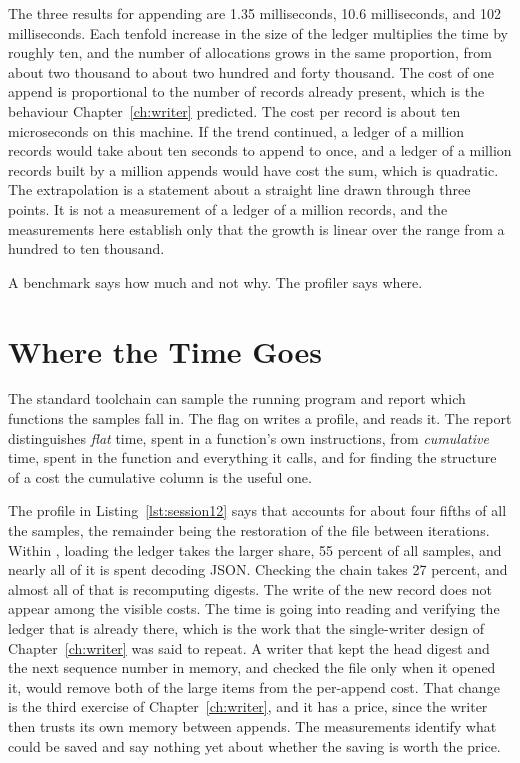 

The three results for appending are 1.35 milliseconds, 10.6 milliseconds, and 102 milliseconds. Each tenfold increase in the size of the ledger multiplies the time by roughly ten, and the number of allocations grows in the same proportion, from about two thousand to about two hundred and forty thousand. The cost of one append is proportional to the number of records already present, which is the behaviour Chapter~\ref{ch:writer} predicted. The cost per record is about ten microseconds on this machine. If the trend continued, a ledger of a million records would take about ten seconds to append to once, and a ledger of a million records built by a million appends would have cost the sum, which is quadratic. The extrapolation is a statement about a straight line drawn through three points. It is not a measurement of a ledger of a million records, and the measurements here establish only that the growth is linear over the range from a hundred to ten thousand.

A benchmark says how much and not why. The profiler says where.

\section{Where the Time Goes}

The standard toolchain can sample the running program and report which functions the samples fall in. The flag  on  writes a profile, and  reads it. The report distinguishes \emph{flat} time, spent in a function's own instructions, from \emph{cumulative} time, spent in the function and everything it calls, and for finding the structure of a cost the cumulative column is the useful one.



The profile in Listing~\ref{lst:session12} says that  accounts for about four fifths of all the samples, the remainder being the restoration of the file between iterations. Within , loading the ledger takes the larger share, 55 percent of all samples, and nearly all of it is spent decoding JSON. Checking the chain takes 27 percent, and almost all of that is recomputing digests. The write of the new record does not appear among the visible costs. The time is going into reading and verifying the ledger that is already there, which is the work that the single-writer design of Chapter~\ref{ch:writer} was said to repeat. A writer that kept the head digest and the next sequence number in memory, and checked the file only when it opened it, would remove both of the large items from the per-append cost. That change is the third exercise of Chapter~\ref{ch:writer}, and it has a price, since the writer then trusts its own memory between appends. The measurements identify what could be saved and say nothing yet about whether the saving is worth the price.

